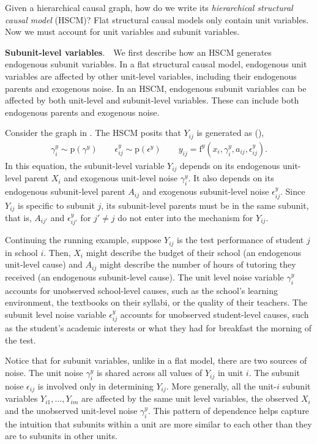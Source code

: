 \documentclass[12pt]{article}
\newcommand{\pr}{\mathrm{p}}
\newcommand{\f}{\mathrm{f}}
\newcommand{\parhead}[1]{\vspace{0.1in} \noindent \textbf{#1}. \,\,}
\begin{document}
Given a hierarchical causal graph, how do we write its \textit{hierarchical structural causal model} (HSCM)?  Flat structural causal models only contain unit variables.  Now we must account for unit variables and subunit variables.

\parhead{Subunit-level variables}  We first describe how an HSCM generates endogenous subunit variables.  In a flat structural causal model, endogenous unit variables are affected by other unit-level variables, including their endogenous parents and exogenous noise.  In an HSCM, endogenous subunit variables can be affected by both unit-level and subunit-level variables.  These can include both endogenous parents and exogenous noise.

Consider the graph in . The HSCM posits that $Y_{ij}$ is generated as (),
\begin{align} \label{eqn:hscm_subunit_gen}
  \gamma_i^y \sim \pr(\gamma^y)
  \quad \quad
  \epsilon_{ij}^y \sim \pr(\epsilon^y)
  \quad \quad
  y_{ij} = \f^y(x_i, \gamma_i^y, a_{ij}, \epsilon^y_{ij}).
\end{align}
In this equation, the subunit-level variable $Y_{ij}$ depends on its endogenous unit-level parent $X_i$ and exogenous unit-level noise $\gamma_i^y$.  It also depends on its endogenous subunit-level parent $A_{ij}$ and exogenous subunit-level noise $\epsilon_{ij}^y$.  Since $Y_{ij}$ is specific to subunit $j$, its subunit-level parents must be in the same subunit, that is, $A_{ij'}$ and $\epsilon_{ij'}^y$ for $j' \neq j$ do not enter into the mechanism for $Y_{ij}$.

Continuing the running example, suppose $Y_{ij}$ is the test performance of student $j$ in school $i$.  Then, $X_i$ might describe the budget of their school (an endogenous unit-level cause) and $A_{ij}$ might describe the number of hours of tutoring they received (an endogenous subunit-level cause).  The unit level noise variable $\gamma_i^y$ accounts for unobserved school-level causes, such as the school's learning environment, the textbooks on their syllabi, or the quality of their teachers.  The subunit level noise variable $\epsilon_{ij}^y$ accounts for unobserved student-level causes, such as the student's academic interests or what they had for breakfast the morning of the test.

Notice that for subunit variables, unlike in a flat model, there are two sources of noise. The unit noise $\gamma_i^{y}$ is shared across all values of $Y_{ij}$ in unit $i$. The subunit noise $\epsilon_{ij}$ is involved only in determining $Y_{ij}$. More generally, all the unit-$i$ subunit variables $Y_{i1}, \ldots, Y_{im}$ are affected by the same unit level variables, the observed $X_i$ and the unobserved unit-level noise $\gamma_i^y$.  This pattern of dependence helps capture the intuition that subunits within a unit are more similar to each other than they are to subunits in other units.
\end{document}
